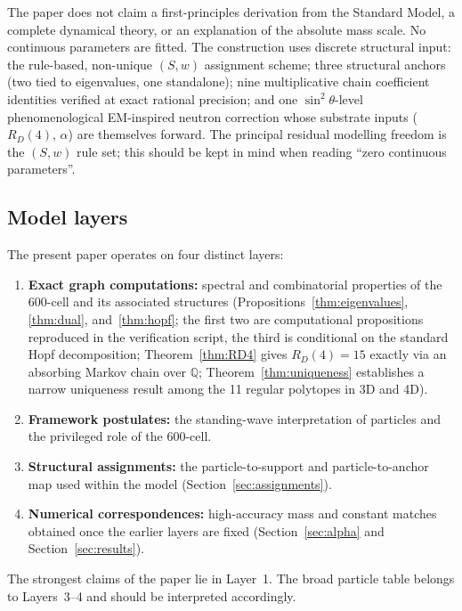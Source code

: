 \documentclass[12pt]{article}
\begin{document}
The paper does not claim a first-principles derivation from the Standard Model, a complete dynamical theory, or an explanation of the absolute mass scale. No continuous parameters are fitted. The construction uses discrete structural input: the rule-based, non-unique $(S,w)$ assignment scheme; three structural anchors (two tied to eigenvalues, one standalone); nine multiplicative chain coefficient identities verified at exact rational precision; and one $\sin^2\theta$-level phenomenological EM-inspired neutron correction whose substrate inputs ($R_D(4)$, $\alpha$) are themselves forward. The principal residual modelling freedom is the $(S,w)$ rule set; this should be kept in mind when reading ``zero continuous parameters''.

\subsection*{Model layers}

The present paper operates on four distinct layers:

\begin{enumerate}
    \item \textbf{Exact graph computations:} spectral and combinatorial properties of the 600-cell and its associated structures (Propositions~\ref{thm:eigenvalues}, \ref{thm:dual}, and~\ref{thm:hopf}; the first two are computational propositions reproduced in the verification script, the third is conditional on the standard Hopf decomposition; Theorem~\ref{thm:RD4} gives $R_D(4) = 15$ exactly via an absorbing Markov chain over $\mathbb{Q}$; Theorem~\ref{thm:uniqueness} establishes a narrow uniqueness result among the 11 regular polytopes in 3D and 4D).
    \item \textbf{Framework postulates:} the standing-wave interpretation of particles and the privileged role of the 600-cell.
    \item \textbf{Structural assignments:} the particle-to-support and particle-to-anchor map used within the model (Section~\ref{sec:assignments}).
    \item \textbf{Numerical correspondences:} high-accuracy mass and constant matches obtained once the earlier layers are fixed (Section~\ref{sec:alpha} and Section~\ref{sec:results}).
\end{enumerate}

The strongest claims of the paper lie in Layer~1. The broad particle table belongs to Layers~3--4 and should be interpreted accordingly.
\end{document}
